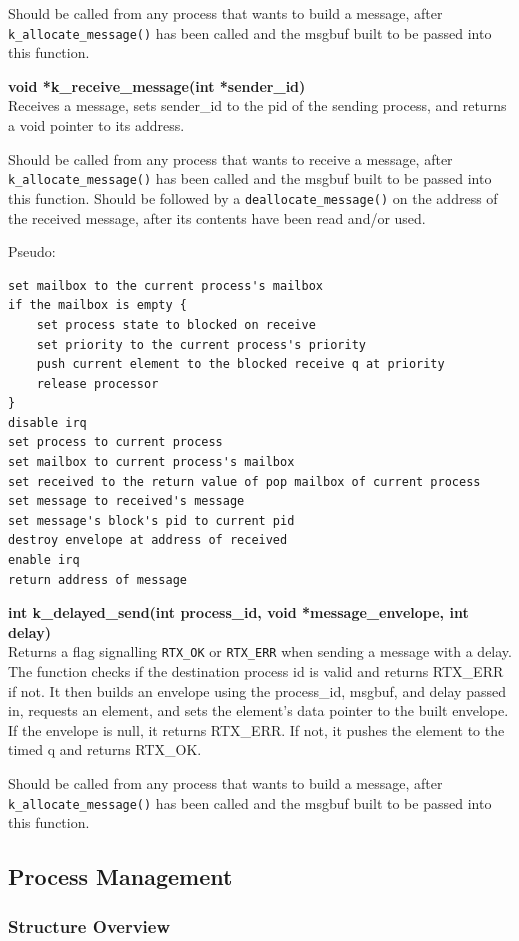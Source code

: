 \documentclass[11pt, oneside]{article}
\begin{document}
Should be called from any process that wants to build a message, after {\tt k\_allocate\_message()} has been called and the msgbuf built to be passed into this function.

{\bf void *k\_receive\_message(int *sender\_id)}\\
Receives a message, sets sender\_id to the pid of the sending process, and returns a void pointer to its address.

Should be called from any process that wants to receive a message, after {\tt k\_allocate\_message()} has been called and the msgbuf built to be passed into this function. Should be followed by a {\tt deallocate\_message()} on the address of the received message, after its contents have been read and/or used.

Pseudo:
\begin{verbatim}
set mailbox to the current process's mailbox
if the mailbox is empty {
    set process state to blocked on receive
    set priority to the current process's priority
    push current element to the blocked receive q at priority
    release processor
}
disable irq
set process to current process
set mailbox to current process's mailbox
set received to the return value of pop mailbox of current process
set message to received's message
set message's block's pid to current pid
destroy envelope at address of received
enable irq
return address of message
\end{verbatim}

{\bf int k\_delayed\_send(int process\_id, void *message\_envelope, int delay)}\\
Returns a flag signalling {\tt RTX\_OK} or {\tt RTX\_ERR} when sending a message with a delay. The function checks if the destination process id is valid and returns RTX\_ERR if not. It then builds an envelope using the process\_id, msgbuf, and delay passed in, requests an element, and sets the element's data pointer to the built envelope. If the envelope is null, it returns RTX\_ERR. If not, it pushes the element to the timed q and returns RTX\_OK.

Should be called from any process that wants to build a message, after {\tt k\_allocate\_message()} has been called and the msgbuf built to be passed into this function.

\subsection{Process Management}
\subsubsection{Structure Overview}
\end{document}
